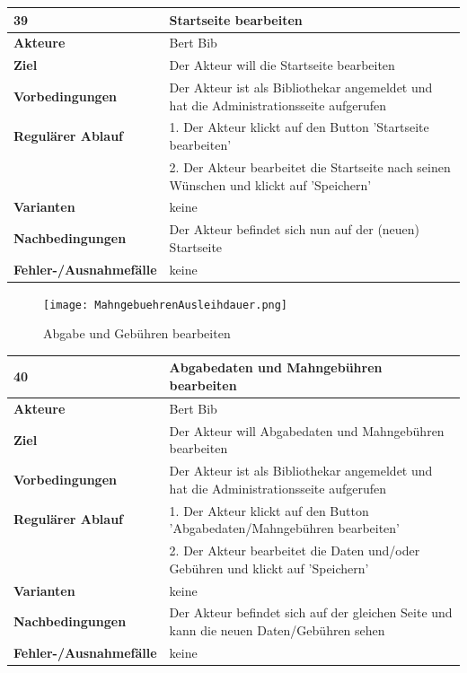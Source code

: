 \documentclass[fontsize=12pt,paper=a4,twoside]{scrartcl}
\begin{document}
\begin{table}
	[H] \label{39} 
	\begin{tabular}
		{|l|p{10cm}|} \hline \textbf{39} & \textbf{Startseite bearbeiten} \\
		\hline \textbf{Akteure} & Bert Bib\\
		\hline \textbf{Ziel} & Der Akteur will die Startseite bearbeiten \\
		\hline \textbf{Vorbedingungen} & Der Akteur ist als Bibliothekar angemeldet und hat die Administrationsseite aufgerufen\\\hline \textbf{Regulärer Ablauf} & 1. Der Akteur klickt auf den Button 'Startseite bearbeiten' \\
		&2. Der Akteur bearbeitet die Startseite nach seinen Wünschen und klickt auf 'Speichern'\\
		\hline \textbf{Varianten} & keine \\
		\hline \textbf{Nachbedingungen} & Der Akteur befindet sich nun auf der (neuen) Startseite \\
		\hline \textbf{Fehler-/Ausnahmefälle} & keine\\
		\hline 
	\end{tabular}
\end{table}
\begin{figure}
	[H] \caption{Abgabe und Gebühren bearbeiten} 
	\texttt{[image: MahngebuehrenAusleihdauer.png]} \label{pic:AbgabeBearbeiten} 
\end{figure}
\begin{table}
	[H] \label{40} 
	\begin{tabular}
		{|l|p{10cm}|} \hline \textbf{40} & \textbf{Abgabedaten und Mahngebühren bearbeiten} \\
		\hline \textbf{Akteure} & Bert Bib\\
		\hline \textbf{Ziel} & Der Akteur will Abgabedaten und Mahngebühren bearbeiten \\
		\hline \textbf{Vorbedingungen} & Der Akteur ist als Bibliothekar angemeldet und hat die Administrationsseite aufgerufen \\
		\hline \textbf{Regulärer Ablauf} & 1. Der Akteur klickt auf den Button 'Abgabedaten/Mahngebühren bearbeiten' \\
		&2. Der Akteur bearbeitet die Daten und/oder Gebühren und klickt auf 'Speichern'\\
		\hline \textbf{Varianten} & keine \\
		\hline \textbf{Nachbedingungen} & Der Akteur befindet sich auf der gleichen Seite und kann die neuen Daten/Gebühren sehen\\
		\hline \textbf{Fehler-/Ausnahmefälle} & keine\\
		\hline 
	\end{tabular}
\end{table}
\end{document}
